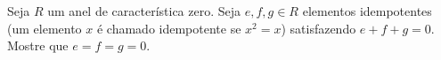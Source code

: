 Seja \(R\) um anel de característica zero. Seja \(e,f,g\in R\) elementos idempotentes (um elemento \(x\) é chamado idempotente se \(x^2=x\)) satisfazendo \(e+f+g=0\). Mostre que \(e=f=g=0\).
